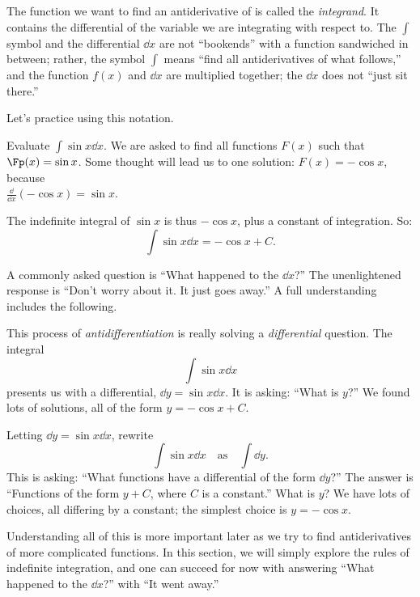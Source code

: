The function we want to find an antiderivative of is called the \emph{integrand}. It contains the differential of the variable we are integrating with respect to. The $\int$ symbol and the differential $\dd x$ are not ``bookends'' with a function sandwiched in between; rather, the symbol $\int$ means ``find all antiderivatives of what follows,'' and the function $f(x)$ and $\dd x$ are multiplied together; the $\dd x$ does not ``just sit there.''

Let's practice using this notation.

\begin{example}\label{ex_anti2}
Evaluate $\displaystyle \int \sin x\dd x$.
\solution
We are asked to find all functions $F(x)$ such that $\Fp(x) = \sin x$. Some thought will lead us to one solution: $F(x) = -\cos x$, because\\
$\frac{\dd}{\dd x}(-\cos x) = \sin x$.

The indefinite integral of $\sin x$ is thus $-\cos x$, plus a constant of integration. So:
\[\int \sin x \dd x = -\cos x + C.\]
\end{example}

A commonly asked question is ``What happened to the $\dd x$?'' The unenlightened response is ``Don't worry about it. It just goes away.'' A full understanding includes the following.


This process of \emph{antidifferentiation} is really solving a \emph{differential} question. The integral
\[\int \sin x\dd x\]
presents us with a differential, $\dd y = \sin x\dd x$. It is asking: ``What is $y$?'' We found lots of solutions, all of the form $y = -\cos x+C$.

Letting $\dd y = \sin x\dd x$,  rewrite 
\[\int \sin x \dd x \quad \text{as}\quad \int \dd y.\]
This is asking: ``What functions have a differential of the form $\dd y$?'' The answer is ``Functions of the form $y+C$, where $C$ is a constant.'' What is $y$? We have lots of choices, all differing by a constant; the simplest choice is $y = -\cos x$.

Understanding all of this is more important later as we try to find antiderivatives of more complicated functions. In this section, we will simply explore the rules of indefinite integration, and one can succeed for now with answering ``What happened to the $\dd x$?'' with ``It went away.''

